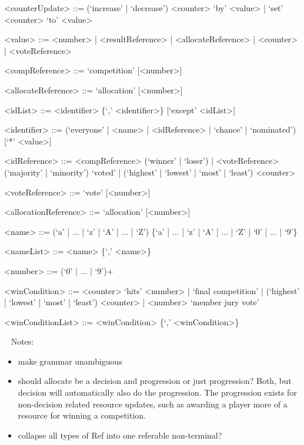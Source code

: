 \documentclass{article}
\begin{document}
\begin{grammar}
<counterUpdate> ::= (`increase' | `decrease') <counter> `by' <value> | `set' 
<counter> `to' <value> 

<value> ::= <number> | <resultReference> | <allocateReference> | <counter> | 
<voteReference>

<compReference> ::= `competition' [<number>] 

<allocateReference> ::= `allocation' [<number>]

<idList> ::= <identifier> \{`,' <identifier>\} [`except' <idList>]

<identifier> ::= (`everyone' | <name> | <idReference> | `chance' | `nominated') 
[`*' <value>]

<idReference> ::= <compReference> (`winner' | `loser') | <voteReference> 
(`majority' | `minority') `voted' | (`highest' | `lowest' | `most' | `least') 
<counter> 

<voteReference> ::= `vote' [<number>]

<allocationReference> ::= `allocation' [<number>]

<name> ::= (`a' | ... | `z' | `A' | ... | `Z') \{`a' | ... | `z' | `A' | ... | 
`Z' | `0' | ... | `9'\}

<nameList> ::= <name> \{`,' <name>\}

<number> ::= (`0' | ... | `9')+

<winCondition> ::= <counter> `hits' <number> | `final competition' | (`highest' 
| `lowest' | `most' | `least') <counter> | <number> `member jury vote'

<winConditionList> ::= <winCondition> \{`,' <winCondition>\}

\end{grammar}

~\newline
Notes:
\begin{itemize}
	\item make grammar unambiguous
	\item should allocate be a decision and progression or just progression? 
	Both, but decision will automatically also do the progression. The 
	progression exists for non-decision related resource updates, such as 
	awarding a player more of a resource for winning a competition.
	\item collapse all types of Ref into one referable non-terminal? 
\end{itemize}
\end{document}
